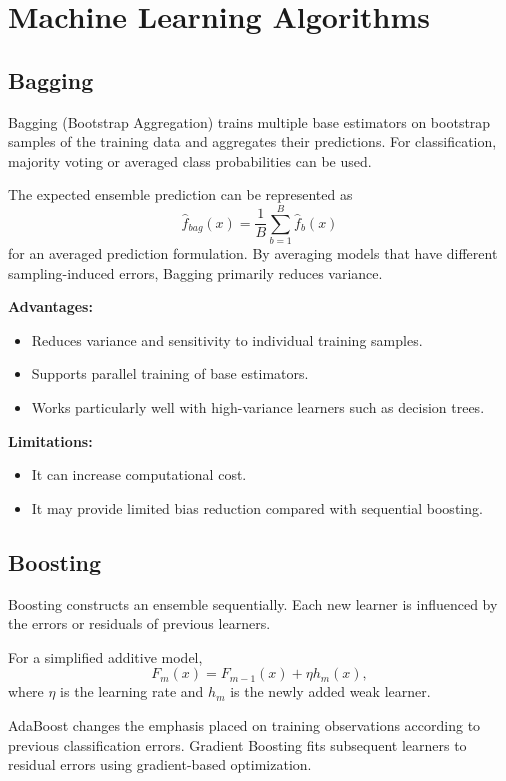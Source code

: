 \documentclass[12pt,a4paper]{article}
\begin{document}
\section{Machine Learning Algorithms}

\subsection{Bagging}
Bagging (Bootstrap Aggregation) trains multiple base estimators on bootstrap samples of the training data and aggregates their predictions. For classification, majority voting or averaged class probabilities can be used.

The expected ensemble prediction can be represented as
\[
\hat{f}_{bag}(x)=\frac{1}{B}\sum_{b=1}^{B}\hat{f}_b(x)
\]
for an averaged prediction formulation. By averaging models that have different sampling-induced errors, Bagging primarily reduces variance.

\textbf{Advantages:}
\begin{itemize}
\item Reduces variance and sensitivity to individual training samples.
\item Supports parallel training of base estimators.
\item Works particularly well with high-variance learners such as decision trees.
\end{itemize}

\textbf{Limitations:}
\begin{itemize}
\item It can increase computational cost.
\item It may provide limited bias reduction compared with sequential boosting.
\end{itemize}

\subsection{Boosting}
Boosting constructs an ensemble sequentially. Each new learner is influenced by the errors or residuals of previous learners.

For a simplified additive model,
\[
F_m(x)=F_{m-1}(x)+\eta h_m(x),
\]
where $\eta$ is the learning rate and $h_m$ is the newly added weak learner.

AdaBoost changes the emphasis placed on training observations according to previous classification errors. Gradient Boosting fits subsequent learners to residual errors using gradient-based optimization.
\end{document}
